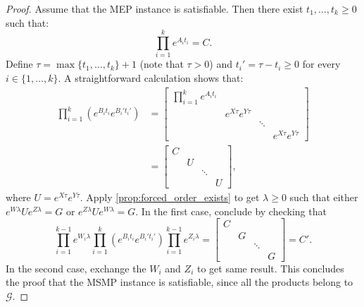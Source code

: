\documentclass[format=acmsmall, review=false, screen=true]{acmart}
\begin{document}
\begin{proof}
Assume that the MEP instance is satisfiable. Then there exist $t_1,\ldots,t_k\geqslant0$ such that:
\[\prod_{i=1}^{k}e^{A_{i}t_{i}}=C.\]
Define $\tau=\max\lbrace t_1,\ldots,t_k\rbrace+1$ (note that $\tau>0$) and $t_{i}'=\tau-t_{i}\geqslant0$ for every $i\in\lbrace 1,\ldots,k\rbrace$.
A straightforward calculation shows that:
\begin{align*}
\prod_{i=1}^{k}\left(e^{B_{i}t_{i}}e^{B_{i}'t_{i}'}\right)
    &=\begin{bmatrix}\prod_{i=1}^{k}e^{A_{i}t_{i}}&&&\\&e^{X\tau}e^{Y\tau}&&\\&&\ddots&\\&&&e^{X\tau}e^{Y\tau}\end{bmatrix}\\
    &=\begin{bmatrix}C&&&\\&U&&\\&&\ddots&\\&&&U\end{bmatrix},
\end{align*}
where $U=e^{X\tau}e^{Y\tau}$. Apply \cref{prop:forced_order_exists} to get $\lambda\geqslant0$
such that either $e^{W\lambda}Ue^{Z\lambda}=G$ or $e^{Z\lambda}Ue^{W\lambda}=G$. In the first case, conclude by
checking that
\[
\prod_{i=1}^{k-1}e^{W_{i}\lambda}\prod_{i=1}^{k}\left(e^{B_{i}t_{i}}e^{B_{i}'t_{i}'}\right)\prod_{i=1}^{k-1}e^{Z_{i}\lambda}
    =\begin{bmatrix}C&&&\\&G&&\\&&\ddots&\\&&&G\end{bmatrix}=C'.
\]
In the second case, exchange the $W_{i}$ and $Z_{i}$ to get same result. This concludes the proof that
the MSMP instance is satisfiable, since all the products belong to $\mathcal{G}$.


\end{proof}
\end{document}
